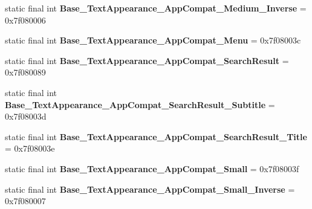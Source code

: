 \begin{DoxyCompactItemize}
\item 
\hypertarget{classandroid_1_1support_1_1v7_1_1appcompat_1_1_r_1_1style_a94e8c40fadcc9eea80252cf4e36c4568}{}static final int {\bfseries Base\+\_\+\+Text\+Appearance\+\_\+\+App\+Compat\+\_\+\+Medium\+\_\+\+Inverse} = 0x7f080006\label{classandroid_1_1support_1_1v7_1_1appcompat_1_1_r_1_1style_a94e8c40fadcc9eea80252cf4e36c4568}

\item 
\hypertarget{classandroid_1_1support_1_1v7_1_1appcompat_1_1_r_1_1style_a157293841296e17ba91feda6068d283f}{}static final int {\bfseries Base\+\_\+\+Text\+Appearance\+\_\+\+App\+Compat\+\_\+\+Menu} = 0x7f08003c\label{classandroid_1_1support_1_1v7_1_1appcompat_1_1_r_1_1style_a157293841296e17ba91feda6068d283f}

\item 
\hypertarget{classandroid_1_1support_1_1v7_1_1appcompat_1_1_r_1_1style_abe1dd23402a2ed299ed4cba9cf8bdb7f}{}static final int {\bfseries Base\+\_\+\+Text\+Appearance\+\_\+\+App\+Compat\+\_\+\+Search\+Result} = 0x7f080089\label{classandroid_1_1support_1_1v7_1_1appcompat_1_1_r_1_1style_abe1dd23402a2ed299ed4cba9cf8bdb7f}

\item 
\hypertarget{classandroid_1_1support_1_1v7_1_1appcompat_1_1_r_1_1style_afee2e2bbe4a577ea3cc8ddcd4101a2af}{}static final int {\bfseries Base\+\_\+\+Text\+Appearance\+\_\+\+App\+Compat\+\_\+\+Search\+Result\+\_\+\+Subtitle} = 0x7f08003d\label{classandroid_1_1support_1_1v7_1_1appcompat_1_1_r_1_1style_afee2e2bbe4a577ea3cc8ddcd4101a2af}

\item 
\hypertarget{classandroid_1_1support_1_1v7_1_1appcompat_1_1_r_1_1style_a58274985c9e5e9b0b52989240ef93e73}{}static final int {\bfseries Base\+\_\+\+Text\+Appearance\+\_\+\+App\+Compat\+\_\+\+Search\+Result\+\_\+\+Title} = 0x7f08003e\label{classandroid_1_1support_1_1v7_1_1appcompat_1_1_r_1_1style_a58274985c9e5e9b0b52989240ef93e73}

\item 
\hypertarget{classandroid_1_1support_1_1v7_1_1appcompat_1_1_r_1_1style_ac1093d122fc007f82bf35e4bdd089958}{}static final int {\bfseries Base\+\_\+\+Text\+Appearance\+\_\+\+App\+Compat\+\_\+\+Small} = 0x7f08003f\label{classandroid_1_1support_1_1v7_1_1appcompat_1_1_r_1_1style_ac1093d122fc007f82bf35e4bdd089958}

\item 
\hypertarget{classandroid_1_1support_1_1v7_1_1appcompat_1_1_r_1_1style_ad2befb41e28e52eed35c0e927dfd9d5e}{}static final int {\bfseries Base\+\_\+\+Text\+Appearance\+\_\+\+App\+Compat\+\_\+\+Small\+\_\+\+Inverse} = 0x7f080007\label{classandroid_1_1support_1_1v7_1_1appcompat_1_1_r_1_1style_ad2befb41e28e52eed35c0e927dfd9d5e}


\end{DoxyCompactItemize}
